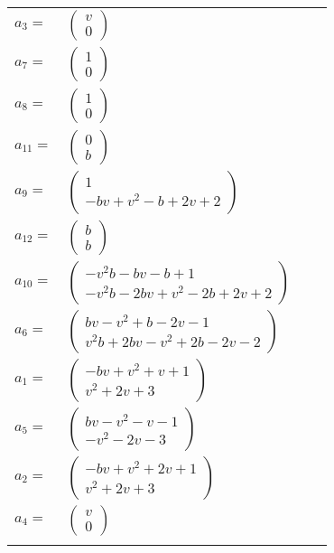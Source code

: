 \documentclass[1p]{elsarticle_modified}
\theoremstyle{definition}
\begin{document}
\begin{tabular}{m{7pt} m{180pt} m{7pt} m{180pt} }
\flushright $a_{3}=$&$\begin{pmatrix}v\\0\end{pmatrix}$ \\
\flushright $a_{7}=$&$\begin{pmatrix}1\\0\end{pmatrix}$ \\
\flushright $a_{8}=$&$\begin{pmatrix}1\\0\end{pmatrix}$ \\
\flushright $a_{11}=$&$\begin{pmatrix}0\\b\end{pmatrix}$ \\
\flushright $a_{9}=$&$\begin{pmatrix}1\\- b v+v^2- b+2 v+2\end{pmatrix}$ \\
\flushright $a_{12}=$&$\begin{pmatrix}b\\b\end{pmatrix}$ \\
\flushright $a_{10}=$&$\begin{pmatrix}- v^2 b- b v- b+1\\- v^2 b-2 b v+v^2-2 b+2 v+2\end{pmatrix}$ \\
\flushright $a_{6}=$&$\begin{pmatrix}b v- v^2+b-2 v-1\\v^2 b+2 b v- v^2+2 b-2 v-2\end{pmatrix}$ \\
\flushright $a_{1}=$&$\begin{pmatrix}- b v+v^2+v+1\\v^2+2 v+3\end{pmatrix}$ \\
\flushright $a_{5}=$&$\begin{pmatrix}b v- v^2- v-1\\- v^2-2 v-3\end{pmatrix}$ \\
\flushright $a_{2}=$&$\begin{pmatrix}- b v+v^2+2 v+1\\v^2+2 v+3\end{pmatrix}$ \\
\flushright $a_{4}=$&$\begin{pmatrix}v\\0\end{pmatrix}$\\&\end{tabular}
\end{document}
